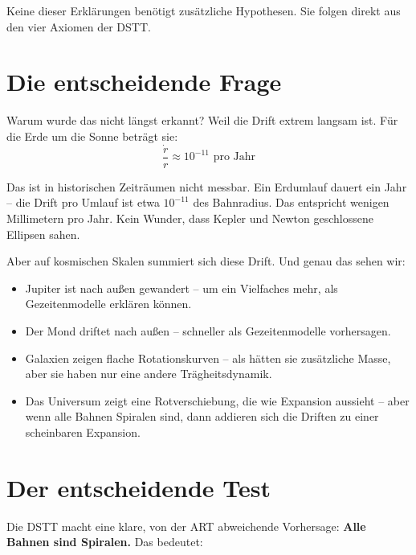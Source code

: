 \documentclass[12pt,a4paper]{article}
\begin{document}
Keine dieser Erklärungen benötigt zusätzliche Hypothesen. Sie folgen direkt aus den vier Axiomen der DSTT.

\section{Die entscheidende Frage}

Warum wurde das nicht längst erkannt? Weil die Drift extrem langsam ist. Für die Erde um die Sonne beträgt sie:
\[
\frac{\dot{r}}{r} \approx 10^{-11} \text{ pro Jahr}
\]

Das ist in historischen Zeiträumen nicht messbar. Ein Erdumlauf dauert ein Jahr – die Drift pro Umlauf ist etwa \(10^{-11}\) des Bahnradius. Das entspricht wenigen Millimetern pro Jahr. Kein Wunder, dass Kepler und Newton geschlossene Ellipsen sahen.

Aber auf kosmischen Skalen summiert sich diese Drift. Und genau das sehen wir:

\begin{itemize}
    \item Jupiter ist nach außen gewandert – um ein Vielfaches mehr, als Gezeitenmodelle erklären können.
    \item Der Mond driftet nach außen – schneller als Gezeitenmodelle vorhersagen.
    \item Galaxien zeigen flache Rotationskurven – als hätten sie zusätzliche Masse, aber sie haben nur eine andere Trägheitsdynamik.
    \item Das Universum zeigt eine Rotverschiebung, die wie Expansion aussieht – aber wenn alle Bahnen Spiralen sind, dann addieren sich die Driften zu einer scheinbaren Expansion.
\end{itemize}

\section{Der entscheidende Test}

Die DSTT macht eine klare, von der ART abweichende Vorhersage: \textbf{Alle Bahnen sind Spiralen.} Das bedeutet:
\end{document}
